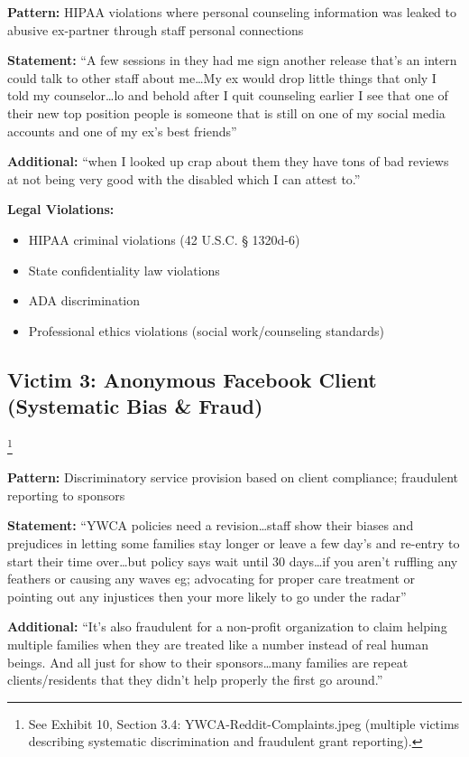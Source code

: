 \documentclass[12pt,oneside]{article}
\begin{document}
\textbf{Pattern:} HIPAA violations where personal counseling information was leaked to abusive ex-partner through staff personal connections

\textbf{Statement:} ``A few sessions in they had me sign another release that's an intern could talk to other staff about me\ldots My ex would drop little things that only I told my counselor\ldots lo and behold after I quit counseling earlier I see that one of their new top position people is someone that is still on one of my social media accounts and one of my ex's best friends''

\textbf{Additional:} ``when I looked up crap about them they have tons of bad reviews at not being very good with the disabled which I can attest to.''

\textbf{Legal Violations:}
\begin{itemize}
\item HIPAA criminal violations (42 U.S.C. § 1320d-6)
\item State confidentiality law violations
\item ADA discrimination
\item Professional ethics violations (social work/counseling standards)
\end{itemize}

\subsection*{Victim 3: Anonymous Facebook Client (Systematic Bias \& Fraud)}\footnote{See Exhibit 10, Section 3.4: YWCA-Reddit-Complaints.jpeg (multiple victims describing systematic discrimination and fraudulent grant reporting).}

\textbf{Pattern:} Discriminatory service provision based on client compliance; fraudulent reporting to sponsors

\textbf{Statement:} ``YWCA policies need a revision\ldots staff show their biases and prejudices in letting some families stay longer or leave a few day's and re-entry to start their time over\ldots but policy says wait until 30 days\ldots if you aren't ruffling any feathers or causing any waves eg; advocating for proper care treatment or pointing out any injustices then your more likely to go under the radar''

\textbf{Additional:} ``It's also fraudulent for a non-profit organization to claim helping multiple families when they are treated like a number instead of real human beings. And all just for show to their sponsors\ldots many families are repeat clients/residents that they didn't help properly the first go around.''
\end{document}
